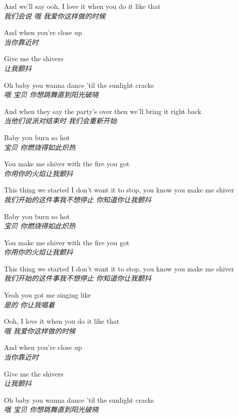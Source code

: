 \begin{spacing}{1.5}
\begin{flushleft}
And we'll say ooh, I love it when you do it like that\\
\textit{我们会说 哦 我爱你这样做的时候}\lyricspace

And when you're close up\\
\textit{当你靠近时}\lyricspace

Give me the shivers\\
\textit{让我颤抖}\lyricspace

Oh baby you wanna dance 'til the sunlight cracks\\
\textit{哦 宝贝 你想跳舞直到阳光破晓}\lyricspace

And when they say the party's over then we'll bring it right back\\
\textit{当他们说派对结束时 我们会重新开始}\lyricspace

Baby you burn so hot\\
\textit{宝贝 你燃烧得如此炽热}\lyricspace

You make me shiver with the fire you got\\
\textit{你用你的火焰让我颤抖}\lyricspace

This thing we started I don't want it to stop, you know you make me shiver\\
\textit{我们开始的这件事我不想停止 你知道你让我颤抖}\lyricspace

Baby you burn so hot\\
\textit{宝贝 你燃烧得如此炽热}\lyricspace

You make me shiver with the fire you got\\
\textit{你用你的火焰让我颤抖}\lyricspace

This thing we started I don't want it to stop, you know you make me shiver\\
\textit{我们开始的这件事我不想停止 你知道你让我颤抖}\lyricspace

Yeah you got me singing like\\
\textit{是的 你让我唱着}\lyricspace

Ooh, I love it when you do it like that\\
\textit{哦 我爱你这样做的时候}\lyricspace

And when you're close up\\
\textit{当你靠近时}\lyricspace

Give me the shivers\\
\textit{让我颤抖}\lyricspace

Oh baby you wanna dance 'til the sunlight cracks\\
\textit{哦 宝贝 你想跳舞直到阳光破晓}\lyricspace


\end{flushleft}
\end{spacing}
